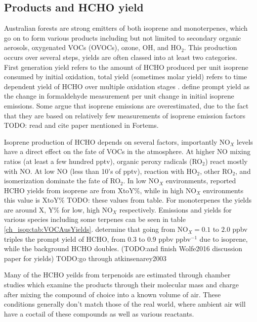   \subsection{Products and HCHO yield}
    Australian forests are strong emitters of both isoprene and monoterpenes, which go on to form various products including but not limited to secondary organic aerosols, oxygenated VOCs (OVOCs), ozone, OH, and HO$_2$.
    This production occurs over several steps, yields are often classed into at least two categories.
    First generation yield refers to the amount of HCHO produced per unit isoprene consumed by initial oxidation, total yield (sometimes molar yield) refers to time dependent yield of HCHO over multiple oxidation stages \citep{Wolfe2016}.
    \citet{Wolfe2016} define prompt yield as the change in formaldehyde measurement per unit change in initial isoprene emissions.
    Some argue that isoprene emissions are overestimated, due to the fact that they are based on relatively few measurements of isoprene emission factors \citep{Winters2009, FortemsCheiney2012, another} TODO: read and cite paper mentioned in Fortems.
    
    Isoprene production of HCHO depends on several factors, importantly NO$_X$ levels have a direct effect on the fate of VOCs in the atmosphere.
    At higher NO mixing ratios (at least a few hundred pptv), organic peroxy radicals (RO$_2$) react mostly with NO. 
    At low NO (less than 10's of pptv), reaction with HO$_2$, other RO$_2$, and isomerization dominate the fate of RO$_2$.
    In low NO$_X$ environments, reported HCHO yields from isoprene are from XtoY\%, while in high NO$_X$ environments this value is XtoY\% TODO: these values from table.
    For monoterpenes the yields are around X, Y\% for low, high NO$_X$ respectively.
    Emissions and yields for various species including some terpenes can be seen in table \ref{ch_isop:tab:VOCAusYields}.
    \citet{Wolfe2016} determine that going from NO$_X = 0.1$ to $2.0$ ppbv triples the prompt yield of HCHO, from 0.3 to 0.9 ppbv ppbv$^{-1}$ due to isoprene, while the background HCHO doubles.
    (TODO:and finish Wolfe2016 discussion paper for yields)
    TODO:go through atkinsenarey2003
    
    
    Many of the HCHO yeilds from terpenoids are estimated through chamber studies which examine the products through their molecular mass and charge after mixing the compound of choice into a known volume of air.
    These conditions generally don't match those of the real world, where ambient air will have a coctail of these compounds as well as various reactants.
    
